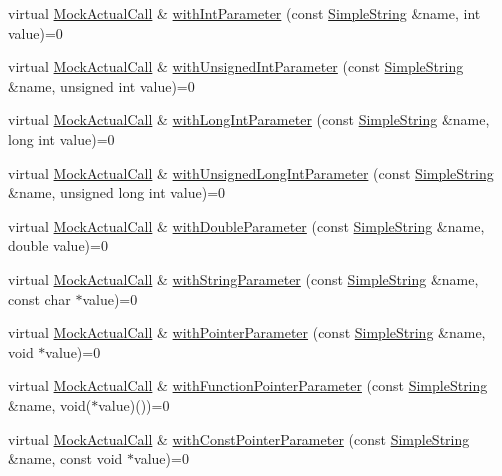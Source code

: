 \begin{DoxyCompactItemize}
\item 
virtual \hyperlink{class_mock_actual_call}{Mock\+Actual\+Call} \& \hyperlink{class_mock_actual_call_a982f58dfb77c52278394c80da90f32d7}{with\+Int\+Parameter} (const \hyperlink{class_simple_string}{Simple\+String} \&name, int value)=0
\item 
virtual \hyperlink{class_mock_actual_call}{Mock\+Actual\+Call} \& \hyperlink{class_mock_actual_call_ae3c79cfced5998c3e4d1381fa78d9cff}{with\+Unsigned\+Int\+Parameter} (const \hyperlink{class_simple_string}{Simple\+String} \&name, unsigned int value)=0
\item 
virtual \hyperlink{class_mock_actual_call}{Mock\+Actual\+Call} \& \hyperlink{class_mock_actual_call_a5747ca52d6aa9c021117beafa539eda0}{with\+Long\+Int\+Parameter} (const \hyperlink{class_simple_string}{Simple\+String} \&name, long int value)=0
\item 
virtual \hyperlink{class_mock_actual_call}{Mock\+Actual\+Call} \& \hyperlink{class_mock_actual_call_ab11fb46b42771e1421ce02b8e1851b9f}{with\+Unsigned\+Long\+Int\+Parameter} (const \hyperlink{class_simple_string}{Simple\+String} \&name, unsigned long int value)=0
\item 
virtual \hyperlink{class_mock_actual_call}{Mock\+Actual\+Call} \& \hyperlink{class_mock_actual_call_a85548dc16aa963eda3ce8d43bd8019ec}{with\+Double\+Parameter} (const \hyperlink{class_simple_string}{Simple\+String} \&name, double value)=0
\item 
virtual \hyperlink{class_mock_actual_call}{Mock\+Actual\+Call} \& \hyperlink{class_mock_actual_call_ab426d81478b34256f373a2717c7a1795}{with\+String\+Parameter} (const \hyperlink{class_simple_string}{Simple\+String} \&name, const char $\ast$value)=0
\item 
virtual \hyperlink{class_mock_actual_call}{Mock\+Actual\+Call} \& \hyperlink{class_mock_actual_call_af860b9475866f73b28b5e487757c3735}{with\+Pointer\+Parameter} (const \hyperlink{class_simple_string}{Simple\+String} \&name, void $\ast$value)=0
\item 
virtual \hyperlink{class_mock_actual_call}{Mock\+Actual\+Call} \& \hyperlink{class_mock_actual_call_a0641606ef3b1e691cc711efe750a8a31}{with\+Function\+Pointer\+Parameter} (const \hyperlink{class_simple_string}{Simple\+String} \&name, void($\ast$value)())=0
\item 
virtual \hyperlink{class_mock_actual_call}{Mock\+Actual\+Call} \& \hyperlink{class_mock_actual_call_afadc5b2bffd82210c3fa33bcd60fffa3}{with\+Const\+Pointer\+Parameter} (const \hyperlink{class_simple_string}{Simple\+String} \&name, const void $\ast$value)=0

\end{DoxyCompactItemize}

